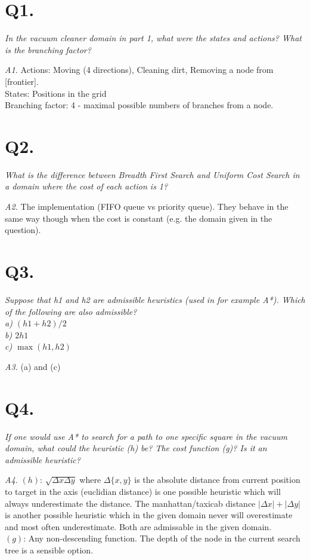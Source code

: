 \clearpage
\setcounter{page}{1}
\section{Q1.}
\em In the vacuum cleaner domain in part 1, what were the states and actions? What is the branching factor?\em

\emph{A1.} Actions: Moving (4 directions), Cleaning dirt, Removing a node from [frontier].\\
    States: Positions in the grid\\
    Branching factor: 4 - maximal possible numbers of branches from a node.\\

\section{Q2.}
\em What is the difference between Breadth First Search and Uniform Cost Search in a domain where the cost
    of each action is 1?\em

\emph{A2.} The implementation (FIFO queue vs priority queue). They behave in the same way though when the cost
    is constant (e.g. the domain given in the question).

\section{Q3.}
\em Suppose that h1 and h2 are admissible heuristics (used in for example A*). Which of the following are
    also admissible?\\
    a) $(h1+h2)/2$\\
    b) $2h1$\\
    c) $\max(h1,h2)$\em

\emph{A3.} (a) and (c)

\section{Q4.}
\em If one would use A* to search for a path to one specific square in the vacuum domain, what could the
    heuristic (h) be? The cost function (g)? Is it an admissible heuristic?\em

\emph{A4.}
    $(h)$: $\sqrt{\Delta{}x\Delta{}y}$ where $\Delta{}\{x,y\}$ is the absolute distance from current
    position to target in the axis (euclidian distance) is one possible heuristic which will always
    underestimate the distance. The manhattan/taxicab distance $|\Delta x| + |\Delta y|$ is another
    possible heuristic which in the given domain never will overestimate and most often underestimate.
    Both are admissable in the given domain.\\
    $(g)$: Any non-descending function. The depth of the node in the current search tree is a sensible option.

